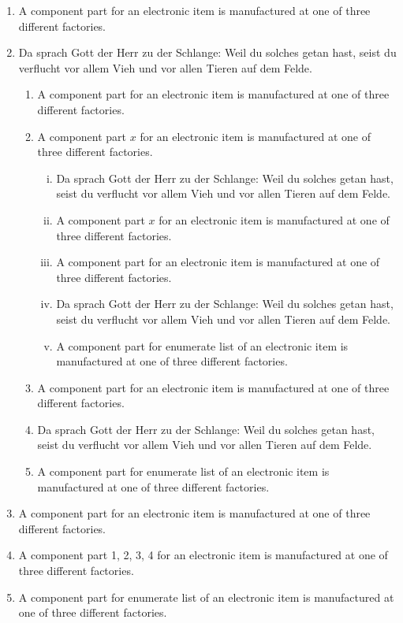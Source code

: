 \begin{enumerate}[1.]
\item A component part for an electronic item is
manufactured at one of three different factories.

\item Da sprach Gott der Herr zu der Schlange: Weil du solches getan hast,
    seist du verflucht vor allem Vieh und vor allen Tieren auf dem
    Felde. 
\begin{enumerate}
\item A component part for an electronic item is
manufactured at one of three different factories.

\item A component part $x$ for an electronic item is
manufactured at one of three different factories.
\begin{enumerate}[iv.]
\item  Da sprach Gott der Herr zu der Schlange: Weil du solches getan hast,
    seist du verflucht vor allem Vieh und vor allen Tieren auf dem
    Felde. 

\item A component part $x$ for an electronic item is
manufactured at one of three different factories.

\item A component part for an electronic item is
manufactured at one of three different factories.

\item Da sprach Gott der Herr zu der Schlange: Weil du solches getan hast,
    seist du verflucht vor allem Vieh und vor allen Tieren auf dem
    Felde. 

\item A component part for enumerate list of an electronic item is
manufactured at one of three different factories.

\end{enumerate}

\item A component part for an electronic item is
manufactured at one of three different factories.

\item Da sprach Gott der Herr zu der Schlange: Weil du solches getan hast,
    seist du verflucht vor allem Vieh und vor allen Tieren auf dem
    Felde. 

\item A component part for enumerate list of an electronic item is
manufactured at one of three different factories.

\end{enumerate}

\item A component part for an electronic item is
manufactured at one of three different factories.

\item A component part 1, 2, 3, 4 for an electronic item is
manufactured at one of three different factories.

\item A component part for enumerate list of an electronic item is
manufactured at one of three different factories.

\end{enumerate}

